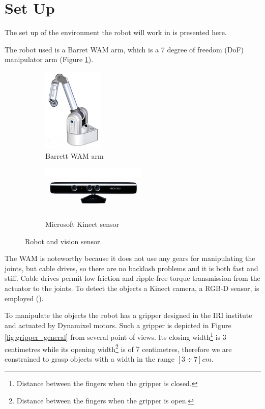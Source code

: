 \section{Set Up}
The set up of the environment the robot will work in is presented here. 

The robot used is a Barret WAM arm, which is a 7 degree of freedom (DoF) manipulator arm (Figure \ref{fig:wam_1}). 
\begin{figure}[tb]
\centering
\begin{subfigure}[b]{0.45\textwidth}
\centering
\includegraphics[height=4cm]{Img/set_up/wam.jpg}
\caption{Barrett WAM arm}\label{fig:wam_1}
\end{subfigure}
\begin{subfigure}[b]{0.45\textwidth}
\centering
\includegraphics[width=5cm]{Img/set_up/Kinect.jpg}
\caption{Microsoft Kinect sensor}\label{fig:kinect}
\end{subfigure}
\caption{Robot and vision sensor.}
\end{figure}
The WAM is noteworthy because it does not use any gears for manipulating the joints, but cable drives, so there are no backlash problems and it is both fast and stiff. Cable drives permit low friction and ripple-free torque transmission from the actuator to the joints. 
To detect the objects a Kinect camera, a RGB-D sensor, is employed ().

To manipulate the objects the robot has a gripper designed in the IRI institute and actuated by Dynamixel motors. Such a gripper is depicted in Figure \ref{fig:gripper_general} from several point of views. Its closing width\footnote{Distance between the fingers when the gripper is closed.} is $3$ centimetres while its opening width\footnote{Distance between the fingers when the gripper is open.} is of $7$ centimetres, therefore we are constrained to grasp objects with a width in the range $[3 \div 7]cm$.

